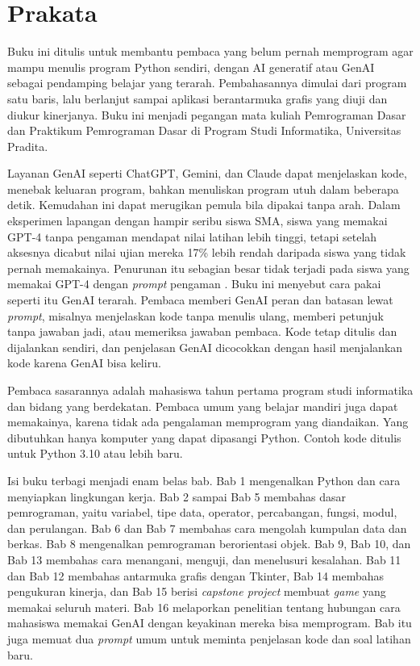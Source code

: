 \chapter{Prakata}

Buku ini ditulis untuk membantu pembaca yang belum pernah memprogram agar mampu menulis program Python sendiri, dengan AI generatif atau GenAI sebagai pendamping belajar yang terarah. Pembahasannya dimulai dari program satu baris, lalu berlanjut sampai aplikasi berantarmuka grafis yang diuji dan diukur kinerjanya. Buku ini menjadi pegangan mata kuliah Pemrograman Dasar dan Praktikum Pemrograman Dasar di Program Studi Informatika, Universitas Pradita.

Layanan GenAI seperti ChatGPT, Gemini, dan Claude dapat menjelaskan kode, menebak keluaran program, bahkan menuliskan program utuh dalam beberapa detik. Kemudahan ini dapat merugikan pemula bila dipakai tanpa arah. Dalam eksperimen lapangan dengan hampir seribu siswa SMA, siswa yang memakai GPT-4 tanpa pengaman mendapat nilai latihan lebih tinggi, tetapi setelah aksesnya dicabut nilai ujian mereka 17\% lebih rendah daripada siswa yang tidak pernah memakainya. Penurunan itu sebagian besar tidak terjadi pada siswa yang memakai GPT-4 dengan \textit{prompt} pengaman \cite{bastani2025}. Buku ini menyebut cara pakai seperti itu GenAI terarah. Pembaca memberi GenAI peran dan batasan lewat \textit{prompt}, misalnya menjelaskan kode tanpa menulis ulang, memberi petunjuk tanpa jawaban jadi, atau memeriksa jawaban pembaca. Kode tetap ditulis dan dijalankan sendiri, dan penjelasan GenAI dicocokkan dengan hasil menjalankan kode karena GenAI bisa keliru.

Pembaca sasarannya adalah mahasiswa tahun pertama program studi informatika dan bidang yang berdekatan. Pembaca umum yang belajar mandiri juga dapat memakainya, karena tidak ada pengalaman memprogram yang diandaikan. Yang dibutuhkan hanya komputer yang dapat dipasangi Python. Contoh kode ditulis untuk Python 3.10 atau lebih baru.

Isi buku terbagi menjadi enam belas bab. Bab 1 mengenalkan Python dan cara menyiapkan lingkungan kerja. Bab 2 sampai Bab 5 membahas dasar pemrograman, yaitu variabel, tipe data, operator, percabangan, fungsi, modul, dan perulangan. Bab 6 dan Bab 7 membahas cara mengolah kumpulan data dan berkas. Bab 8 mengenalkan pemrograman berorientasi objek. Bab 9, Bab 10, dan Bab 13 membahas cara menangani, menguji, dan menelusuri kesalahan. Bab 11 dan Bab 12 membahas antarmuka grafis dengan Tkinter, Bab 14 membahas pengukuran kinerja, dan Bab 15 berisi \textit{capstone project} membuat \textit{game} yang memakai seluruh materi. Bab 16 melaporkan penelitian tentang hubungan cara mahasiswa memakai GenAI dengan keyakinan mereka bisa memprogram. Bab itu juga memuat dua \textit{prompt} umum untuk meminta penjelasan kode dan soal latihan baru.

